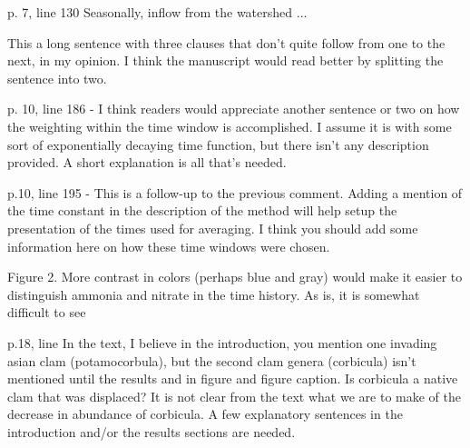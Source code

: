 \documentclass[letterpaper,12pt]{article}
\begin{document}
p. 7, line 130   Seasonally, inflow from the watershed ...

This a long sentence with three clauses that don't quite follow from one to the next, in my opinion.  I think the manuscript would read better by splitting the sentence into two.

p. 10, line 186 - I think readers would appreciate another sentence or two on how the weighting within the time window is accomplished.  I assume it is with some sort of exponentially decaying time function, but there isn't any description provided.  A short explanation is all that's needed.  

p.10, line 195 - This is a follow-up to the previous comment.  Adding a mention of the time constant in the description of the method will help setup the presentation of the times used for averaging.  I think you should add some information here on how these time windows were chosen.

Figure 2.  More contrast in colors (perhaps blue and gray) would make it easier to distinguish ammonia and nitrate in the time history.  As is, it is somewhat difficult to see

p.18, line  In the text, I believe in the introduction, you mention one invading asian clam (potamocorbula), but the second clam genera (corbicula) isn't mentioned until the results and in figure and figure caption.  Is corbicula a native clam that was displaced?  It is not clear from the text what we are to make of the decrease in abundance of corbicula.  A few explanatory sentences in the introduction and/or the results sections are needed.
\end{document}
